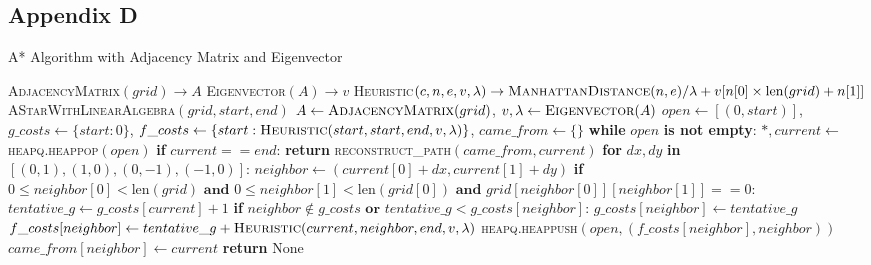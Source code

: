 \documentclass[12pt]{article}
\begin{document}
\subsection*{Appendix D}
\begin{algorithm}
\caption{A* Algorithm with Adjacency Matrix and Eigenvector}
\begin{algorithmic}[1]
 \textsc{AdjacencyMatrix}$(grid) \rightarrow A$
 \textsc{Eigenvector}$(A) \rightarrow v$
 \textsc{Heuristic}$(c, n, e, v, \lambda) \rightarrow \textsc{ManhattanDistance}(n, e) / \lambda + v[n[0] \times \text{len}(grid) + n[1]]$
 \textsc{AStarWithLinearAlgebra}$(grid, start, end)$
\STATE \quad $A \gets \textsc{AdjacencyMatrix}(grid)$, $v, \lambda \gets \textsc{Eigenvector}(A)$
\STATE \quad $open \gets [(0, start)]$, $g\_costs \gets \{start: 0\}$, $f\_costs \gets \{start: \textsc{Heuristic}(start, start, end, v, \lambda)\}$, $came\_from \gets \{\}$
\STATE \quad \textbf{while} $open$ \textbf{is not empty}:
\STATE \quad \quad $*, current \gets$ \textsc{heapq.heappop}$(open)$
\STATE \quad \quad \textbf{if} $current == end$: \textbf{return} \textsc{reconstruct\_path}$(came\_from, current)$
\STATE \quad \quad \textbf{for} $dx, dy$ \textbf{in} $[(0,1),(1,0),(0,-1),(-1,0)]$:
\STATE \quad \quad \quad $neighbor \gets (current[0]+dx, current[1]+dy)$
\STATE \quad \quad \quad \textbf{if} $0 \le neighbor[0] < \text{len}(grid) \textbf{ and } 0 \le neighbor[1] < \text{len}(grid[0]) \textbf{ and } grid[neighbor[0]][neighbor[1]] == 0$:
\STATE \quad \quad \quad \quad $tentative\_g \gets g\_costs[current] + 1$
\STATE \quad \quad \quad \quad \textbf{if} $neighbor \notin g\_costs \textbf{ or } tentative\_g < g\_costs[neighbor]$:
\STATE \quad \quad \quad \quad \quad $g\_costs[neighbor] \gets tentative\_g$
\STATE \quad \quad \quad \quad \quad $f\_costs[neighbor] \gets tentative\_g + \textsc{Heuristic}(current, neighbor, end, v, \lambda)$
\STATE \quad \quad \quad \quad \quad \textsc{heapq.heappush}$(open, (f\_costs[neighbor], neighbor))$
\STATE \quad \quad \quad \quad \quad $came\_from[neighbor] \gets current$
\STATE \quad \textbf{return} None
\end{algorithmic}
\end{algorithm}
\end{document}
